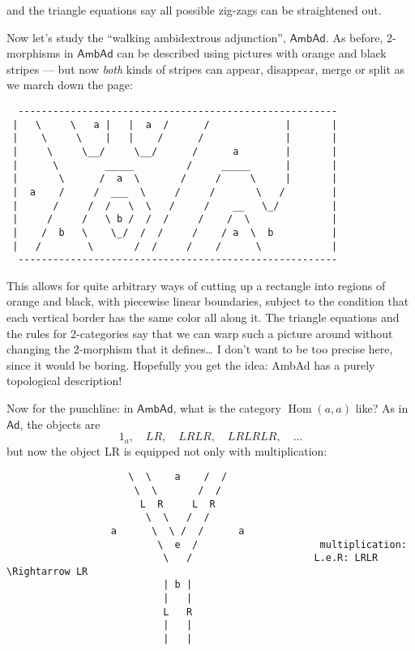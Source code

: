 \documentclass{article}
\begin{document}
and the triangle equations say all possible zig-zags can be straightened
out.

Now let's study the ``walking ambidextrous adjunction'',
\(\mathsf{AmbAd}\). As before, 2-morphisms in \(\mathsf{AmbAd}\) can be
described using pictures with orange and black stripes --- but now
\emph{both} kinds of stripes can appear, disappear, merge or split as we
march down the page:

\begin{verbatim}
  -------------------------------------------------------
 |   \     \   a |   |  a  /      /             |       |
 |    \     \    |   |    /      /              |       |
 |     \     \__/     \__/      /      a        |       |
 |      \        _____         /     _____      |       |
 |       \      /  a  \       /     /     \     |       |
 |  a    /     /  ___  \     /     /       \   /        |
 |      /     /  /   \  \   /     /    __   \_/         |
 |     /     /   \ b /  /  /     /    /  \              |
 |    /  b   \    \_/  /  /     /    / a  \  b          |
 |   /        \       /  /     /    /      \            |
  -------------------------------------------------------
\end{verbatim}

This allows for quite arbitrary ways of cutting up a rectangle into
regions of orange and black, with piecewise linear boundaries, subject
to the condition that each vertical border has the same color all along
it. The triangle equations and the rules for 2-categories say that we
can warp such a picture around without changing the 2-morphism that it
defines\ldots{} I don't want to be too precise here, since it would be
boring. Hopefully you get the idea: AmbAd has a purely topological
description!

Now for the punchline: in \(\mathsf{AmbAd}\), what is the category
\(\operatorname{Hom}(a,a)\) like? As in \(\mathsf{Ad}\), the objects are
\[1_a,\quad LR,\quad LRLR,\quad LRLRLR,\quad \ldots\] but now the object
LR is equipped not only with multiplication:

\begin{verbatim}
                     \  \    a    /  /  
                      \  \       /  /
                       L  R     L  R
                        \  \   /  /
                  a      \  \ /  /      a      
                          \  e  /                     multiplication:
                           \   /                     L.e.R: LRLR \Rightarrow LR 
                           | b |
                           |   |
                           L   R
                           |   |
                           |   |   
\end{verbatim}
\end{document}
